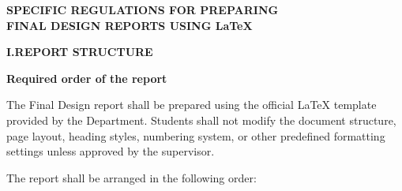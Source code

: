 
\clearpage
\thispagestyle{empty}

\begin{center}
    {\fontsize{16pt}{20pt}\selectfont\bfseries
    SPECIFIC REGULATIONS FOR PREPARING\\
    FINAL DESIGN REPORTS USING \LaTeX}
\end{center}

\vspace{0.5cm}

{\fontsize{13pt}{17pt}\selectfont
{}
\justifying

\newcommand{\RegSection}[2]{%
    \par\vspace{0.45cm}\noindent
    {\fontsize{15pt}{19pt}\selectfont\bfseries #1.\quad #2}\par
    \vspace{0.12cm}}
\newcommand{\RegSubsection}[1]{%
    \par\vspace{0.18cm}\noindent
    {\fontsize{13pt}{17pt}\selectfont\bfseries #1}\par
    \vspace{0.06cm}}
\newcommand{\RegExample}{\textbf{Example.}\quad}


\RegSection{I}{REPORT STRUCTURE}

\RegSubsection{Required order of the report}

The Final Design report shall be prepared using the official
\LaTeX{} template provided by the Department. Students shall not modify
the document structure, page layout, heading styles, numbering
system, or other predefined formatting settings unless approved by
the supervisor.

The report shall be arranged in the following order:

}
